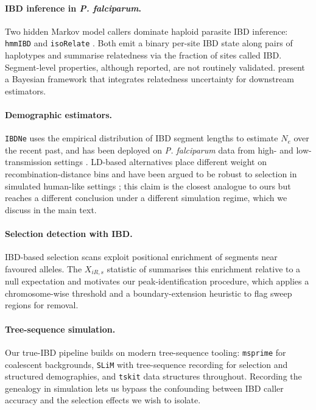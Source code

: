 \paragraph{IBD inference in \textit{P. falciparum}.} Two hidden Markov model callers dominate haploid parasite IBD inference: \texttt{hmmIBD} \citep{schaffner2018hmmibd} and \texttt{isoRelate} \citep{henden2018isorelate}. Both emit a binary per-site IBD state along pairs of haplotypes and summarise relatedness via the fraction of sites called IBD. Segment-level properties, although reported, are not routinely validated. \citet{taylor2019ibd} present a Bayesian framework that integrates relatedness uncertainty for downstream estimators.

\paragraph{Demographic estimators.} \texttt{IBDNe} \citep{browning2015ibdne} uses the empirical distribution of IBD segment lengths to estimate $N_e$ over the recent past, and has been deployed on \textit{P. falciparum} data from high- and low-transmission settings \citep{daniels2015modeling,wong2017genetic}. LD-based alternatives place different weight on recombination-distance bins and have been argued to be robust to selection in simulated human-like settings \citep{novo2022ld}; this claim is the closest analogue to ours but reaches a different conclusion under a different simulation regime, which we discuss in the main text.

\paragraph{Selection detection with IBD.} IBD-based selection scans exploit positional enrichment of segments near favoured alleles. The $X_{iR,s}$ statistic of \citet{henden2018xirs} summarises this enrichment relative to a null expectation and motivates our peak-identification procedure, which applies a chromosome-wise threshold and a boundary-extension heuristic to flag sweep regions for removal.

\paragraph{Tree-sequence simulation.} Our true-IBD pipeline builds on modern tree-sequence tooling: \texttt{msprime} \citep{kelleher2016msprime,baumdicker2022msprime} for coalescent backgrounds, \texttt{SLiM} \citep{haller2019slim} with tree-sequence recording \citep{haller2019treeseq,kelleher2018efficient} for selection and structured demographies, and \texttt{tskit} data structures throughout. Recording the genealogy in simulation lets us bypass the confounding between IBD caller accuracy and the selection effects we wish to isolate.

